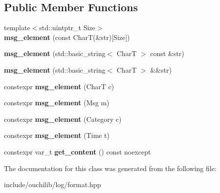 \subsection*{Public Member Functions}
\begin{DoxyCompactItemize}
\item 
\mbox{\label{classouchi_1_1log_1_1msg__element_aa854cd826a721e12d819cded9999a096}} 
{\footnotesize template$<$std\+::uintptr\+\_\+t Size$>$ }\\{\bfseries msg\+\_\+element} (const CharT(\&str)\mbox{[}Size\mbox{]})
\item 
\mbox{\label{classouchi_1_1log_1_1msg__element_aa2a25ef6ac68d69ee33d745bdb89249b}} 
{\bfseries msg\+\_\+element} (std\+::basic\+\_\+string$<$ CharT $>$ const \&str)
\item 
\mbox{\label{classouchi_1_1log_1_1msg__element_a053fe4a0e9515480862e4f3b1f4c69b7}} 
{\bfseries msg\+\_\+element} (std\+::basic\+\_\+string$<$ CharT $>$ \&\&str)
\item 
\mbox{\label{classouchi_1_1log_1_1msg__element_a0ba29107c1668b999d4dd732fba7fdb1}} 
constexpr {\bfseries msg\+\_\+element} (CharT c)
\item 
\mbox{\label{classouchi_1_1log_1_1msg__element_a5e76df2a25d1a8268f97b0756c4fa525}} 
constexpr {\bfseries msg\+\_\+element} (Msg m)
\item 
\mbox{\label{classouchi_1_1log_1_1msg__element_ae9713a741beb0968ef42d383b0643100}} 
constexpr {\bfseries msg\+\_\+element} (Category c)
\item 
\mbox{\label{classouchi_1_1log_1_1msg__element_a17827feb6d222ad29ee02ef05f448aff}} 
constexpr {\bfseries msg\+\_\+element} (Time t)
\item 
\mbox{\label{classouchi_1_1log_1_1msg__element_a6442eebafb4bd9b202f7f7fe775d7a5d}} 
constexpr var\+\_\+t {\bfseries get\+\_\+content} () const noexcept
\end{DoxyCompactItemize}


The documentation for this class was generated from the following file\+:\begin{DoxyCompactItemize}
\item 
include/ouchilib/log/format.\+hpp\end{DoxyCompactItemize}

